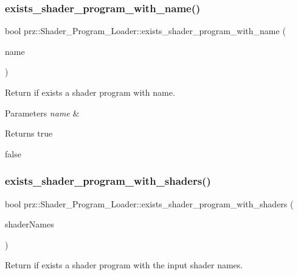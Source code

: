 \subsubsection{\texorpdfstring{exists\_shader\_program\_with\_name()}{exists\_shader\_program\_with\_name()}}
{\footnotesize\ttfamily bool prz\+::\+Shader\+\_\+\+Program\+\_\+\+Loader\+::exists\+\_\+shader\+\_\+program\+\_\+with\+\_\+name (\begin{DoxyParamCaption}\item[{const P\+String \&}]{name }\end{DoxyParamCaption})\hspace{0.3cm}{\ttfamily [inline]}}



Return if exists a shader program with name. 


\begin{DoxyParams}{Parameters}
{\em name} & \\
\hline
\end{DoxyParams}
\begin{DoxyReturn}{Returns}
true 

false 
\end{DoxyReturn}
\mbox{\label{classprz_1_1_shader___program___loader_a2d0b7273a7c0d96a59a29e392670f998}} 
\subsubsection{\texorpdfstring{exists\_shader\_program\_with\_shaders()}{exists\_shader\_program\_with\_shaders()}\hspace{0.1cm}{\footnotesize\ttfamily [1/2]}}
{\footnotesize\ttfamily bool prz\+::\+Shader\+\_\+\+Program\+\_\+\+Loader\+::exists\+\_\+shader\+\_\+program\+\_\+with\+\_\+shaders (\begin{DoxyParamCaption}\item[{P\+Buffer$<$ P\+String $>$ \&}]{shader\+Names }\end{DoxyParamCaption})\hspace{0.3cm}{\ttfamily [inline]}}



Return if exists a shader program with the input shader names. 


